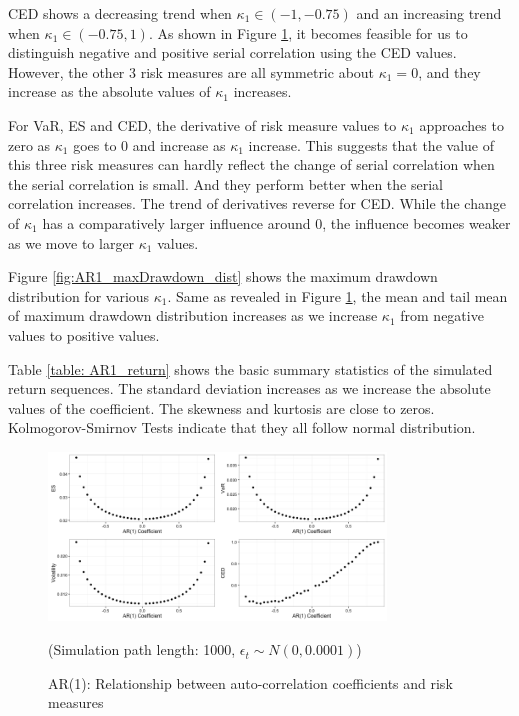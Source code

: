 \documentclass[11pt]{article}
\begin{document}
CED shows a decreasing trend when $\kappa_1\in(-1, -0.75)$ and an increasing trend when $\kappa_1 \in(-0.75, 1)$. As shown in Figure \ref{fig:AR1_risk_measures}, it becomes feasible for us to distinguish negative and positive serial correlation using the CED values. However, the other 3 risk measures are all symmetric about $\kappa_1 = 0$, and they increase as the absolute values of $\kappa_1$ increases.

For VaR, ES and CED, the derivative of risk measure values to $\kappa_1$ approaches to zero as  $\kappa_1$ goes to 0 and increase as $\kappa_1$ increase. This suggests that the value of this three risk measures can hardly reflect the change of serial correlation when the serial correlation is small. And they perform better when the serial correlation increases. The trend of derivatives reverse for CED. While the change of $\kappa_1$ has a comparatively larger influence around 0, the influence becomes weaker as we move to larger  $\kappa_1$ values.

Figure \ref{fig:AR1_maxDrawdown_dist} shows the maximum drawdown distribution for various $\kappa_1$. Same as revealed in Figure \ref{fig:AR1_risk_measures}, the mean and tail mean of maximum drawdown distribution increases as we increase $\kappa_1$ from negative values to positive values.

Table \ref{table: AR1_return} shows the basic summary statistics of the simulated return sequences. The standard deviation increases as we increase the absolute values of the coefficient. The skewness and kurtosis are close to zeros. Kolmogorov-Smirnov Tests indicate that they all follow normal distribution. 

\begin{figure}[H]
\centering
\includegraphics[width = 0.8\textwidth]{../figures/simulation/AR1_risk_measures}
\caption{AR(1): Relationship between auto-correlation coefficients and risk measures}
(Simulation path length: 1000, $\epsilon_t \sim N(0, 0.0001)$)
\label{fig:AR1_risk_measures}
\end{figure}
\end{document}
